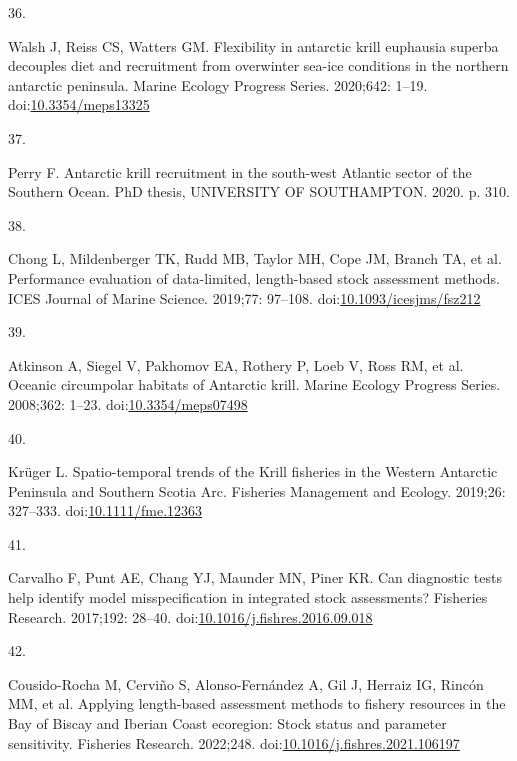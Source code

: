 \documentclass[
]{article}
\newlength{\cslhangindent}
\newlength{\csllabelwidth}
\newlength{\cslentryspacingunit} %
\newenvironment{CSLReferences}[2] %
 {%
  \setlength{\parindent}{0pt}
  \ifodd #1
  \let\oldpar\par
  \def\par{\hangindent=\cslhangindent\oldpar}
  \fi
  \setlength{\parskip}{#2\cslentryspacingunit}
 }%
 {}
\newcommand{\CSLLeftMargin}[1]{\parbox[t]{\csllabelwidth}{#1}}
\newcommand{\CSLRightInline}[1]{\parbox[t]{\linewidth - \csllabelwidth}{#1}\break}
\begin{document}
\begin{CSLReferences}{0}{0}
\leavevmode{}%
\CSLLeftMargin{36. }%
\CSLRightInline{Walsh J, Reiss CS, Watters GM. {Flexibility in antarctic
krill euphausia superba decouples diet and recruitment from overwinter
sea-ice conditions in the northern antarctic peninsula}. Marine Ecology
Progress Series. 2020;642: 1--19.
doi:\href{https://doi.org/10.3354/meps13325}{10.3354/meps13325}}

\leavevmode{}%
\CSLLeftMargin{37. }%
\CSLRightInline{Perry F. {Antarctic krill recruitment in the south-west
Atlantic sector of the Southern Ocean}. PhD thesis, UNIVERSITY OF
SOUTHAMPTON. 2020. p. 310. }

\leavevmode{}%
\CSLLeftMargin{38. }%
\CSLRightInline{Chong L, Mildenberger TK, Rudd MB, Taylor MH, Cope JM,
Branch TA, et al. {Performance evaluation of data-limited, length-based
stock assessment methods}. ICES Journal of Marine Science. 2019;77:
97--108.
doi:\href{https://doi.org/10.1093/icesjms/fsz212}{10.1093/icesjms/fsz212}}

\leavevmode{}%
\CSLLeftMargin{39. }%
\CSLRightInline{Atkinson A, Siegel V, Pakhomov EA, Rothery P, Loeb V,
Ross RM, et al. {Oceanic circumpolar habitats of Antarctic krill}.
Marine Ecology Progress Series. 2008;362: 1--23.
doi:\href{https://doi.org/10.3354/meps07498}{10.3354/meps07498}}

\leavevmode{}%
\CSLLeftMargin{40. }%
\CSLRightInline{Krüger L. {Spatio-temporal trends of the Krill fisheries
in the Western Antarctic Peninsula and Southern Scotia Arc}. Fisheries
Management and Ecology. 2019;26: 327--333.
doi:\href{https://doi.org/10.1111/fme.12363}{10.1111/fme.12363}}

\leavevmode{}%
\CSLLeftMargin{41. }%
\CSLRightInline{Carvalho F, Punt AE, Chang YJ, Maunder MN, Piner KR.
{Can diagnostic tests help identify model misspecification in integrated
stock assessments?} Fisheries Research. 2017;192: 28--40.
doi:\href{https://doi.org/10.1016/j.fishres.2016.09.018}{10.1016/j.fishres.2016.09.018}}

\leavevmode{}%
\CSLLeftMargin{42. }%
\CSLRightInline{Cousido-Rocha M, Cerviño S, Alonso-Fernández A, Gil J,
Herraiz IG, Rincón MM, et al. {Applying length-based assessment methods
to fishery resources in the Bay of Biscay and Iberian Coast ecoregion:
Stock status and parameter sensitivity}. Fisheries Research. 2022;248.
doi:\href{https://doi.org/10.1016/j.fishres.2021.106197}{10.1016/j.fishres.2021.106197}}


\end{CSLReferences}
\end{document}
